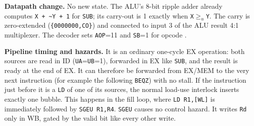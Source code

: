 \documentclass[10pt,a4paper]{article}
\begin{document}
\textbf{Datapath change.} No new state. The ALU's 8-bit ripple adder already computes
\texttt{X + \textasciitilde Y + 1} for \texttt{SUB}; its carry-out is 1 exactly when \texttt{X}$\ge_u$\texttt{Y}. The carry is
zero-extended (\texttt{\{0000000,CO\}}) and connected to input 3 of the ALU result 4:1 multiplexer. The decoder sets
\texttt{AOP}=11 and \texttt{SB}=1 for opcode .

\textbf{Pipeline timing and hazards.} It is an ordinary one-cycle EX operation: both sources are read in ID
(\texttt{UA}=\texttt{UB}=1), forwarded in EX like \texttt{SUB}, and the result is ready at the end of EX. It can
therefore be forwarded from EX/MEM to the very next instruction (for example the following \texttt{BEQZ}) with no stall.
If the instruction just before it is a \texttt{LD} of one of its sources, the normal load-use interlock inserts exactly
one bubble. This happens in the fill loop, where \texttt{LD R1,[WL]} is immediately followed by \texttt{SGEU R1,R4}.
\texttt{SGEU} causes no control hazard. It writes \texttt{Rd} only in WB, gated by the valid bit like every other write.
\end{document}
